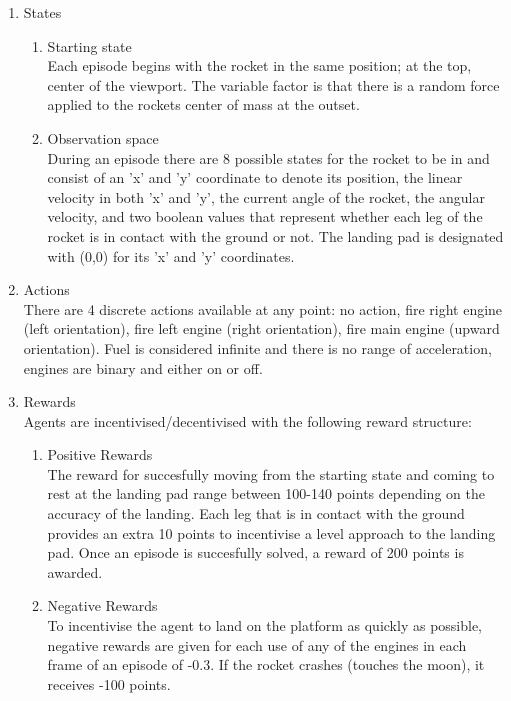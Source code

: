 \documentclass{article}
\begin{document}
\begin{enumerate}
  \item States
  \begin{enumerate}
    \item Starting state\\
    Each episode begins with the rocket in the same position; at the top, center of the viewport. The variable factor is that there is a random force applied to the rockets center of mass at the outset.
    
    \item Observation space\\
     During an episode there are 8 possible states for the rocket to be in and consist of an 'x' and 'y' coordinate to denote its position, the linear velocity in both 'x' and 'y', the current angle of the rocket, the angular velocity, and two boolean values that represent whether each leg of the rocket is in contact with the ground or not. The landing pad is designated with (0,0) for its 'x' and 'y' coordinates.
  \end{enumerate}
  \item Actions\\
    There are 4 discrete actions available at any point: no action, fire right engine (left orientation), fire left engine (right orientation), fire main engine (upward orientation). Fuel is considered infinite and there is no range of acceleration, engines are binary and either on or off.
  
  \item Rewards\\
  Agents are incentivised/decentivised with the following reward structure:\\
  \begin{enumerate}
    \item Positive Rewards\\
    The reward for succesfully moving from the starting state and coming to rest at the landing pad range between 100-140 points depending on the accuracy of the landing. Each leg that is in contact with the ground provides an extra 10 points to incentivise a level approach to the landing pad. Once an episode is succesfully solved, a reward of 200 points is awarded.
    \item Negative Rewards\\
    To incentivise the agent to land on the platform as quickly as possible, negative rewards are given for each use of any of the engines in each frame of an episode of -0.3. If the rocket crashes (touches the moon), it receives -100 points.
  \end{enumerate}


\end{enumerate}
\end{document}

